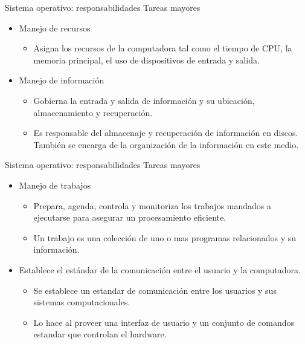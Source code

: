 \documentclass[11pt]{beamer}
\begin{document}
		\begin{frame}{Sistema operativo: responsabilidades}
			Tareas mayores
			\begin{itemize}
				\item Manejo de recursos
				\begin{itemize}
					\item Asigna los recursos de la computadora tal como el tiempo de CPU, la memoria principal, el uso de dispositivos de entrada y salida.
				\end{itemize}
				\item Manejo de información
				\begin{itemize}
					\item Gobierna la entrada y salida de información y su ubicación, almacenamiento y recuperación.
					\item Es responsable del almacenaje y recuperación de información en discos. También se encarga de la organización de la información en este medio.
				\end{itemize}
			\end{itemize}
		\end{frame}
		\begin{frame}{Sistema operativo: responsabilidades}
			Tareas mayores
			\begin{itemize}				
				\item Manejo de trabajos
				\begin{itemize}
					\item Prepara, agenda, controla y monitoriza los trabajos mandados a ejecutarse para asegurar un procesamiento eficiente.
					\item Un trabajo es una colección de uno o mas programas relacionados y su información.
				\end{itemize}
				\item Establece el estándar de la comunicación entre el usuario y la computadora.
				\begin{itemize}
					\item Se establece un estandar de comunicación entre los usuarios y sus sistemas computacionales.
					\item Lo hace al proveer una interfaz de usuario y un  conjunto de comandos estandar que controlan el hardware.
				\end{itemize}
			\end{itemize}
		\end{frame}
\end{document}
